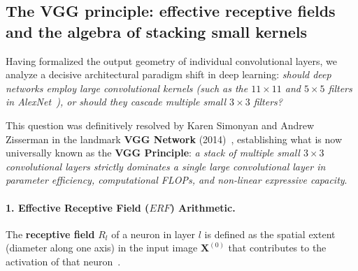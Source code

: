 \subsection{The VGG principle: effective receptive fields and the algebra of stacking small kernels}
\label{sec:vgg_principle_stacking_small_kernels}

Having formalized the output geometry of individual convolutional layers, we analyze a decisive architectural paradigm shift in deep learning: \textit{should deep networks employ large convolutional kernels (such as the $11 \times 11$ and $5 \times 5$ filters in AlexNet~\cite{krizhevsky2012imagenet}), or should they cascade multiple small $3 \times 3$ filters?}~\cite{simonyan2014very,bishop2024deep}

This question was definitively resolved by Karen Simonyan and Andrew Zisserman in the landmark \textbf{VGG Network} (2014)~\cite{simonyan2014very}, establishing what is now universally known as the \textbf{VGG Principle}: \textit{a stack of multiple small $3 \times 3$ convolutional layers strictly dominates a single large convolutional layer in parameter efficiency, computational FLOPs, and non-linear expressive capacity}.

\paragraph{1. Effective Receptive Field ($ERF$) Arithmetic.}
The \textbf{receptive field} $R_l$ of a neuron in layer $l$ is defined as the spatial extent (diameter along one axis) in the input image $\mathbf{X}^{(0)}$ that contributes to the activation of that neuron~\cite{bishop2024deep,prince2023understanding}.

